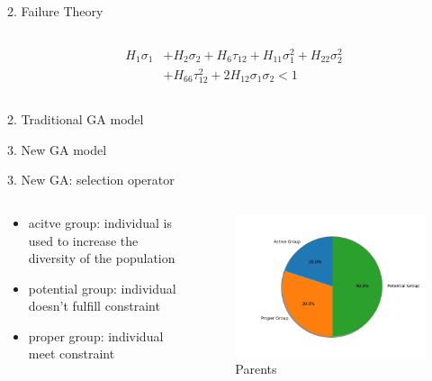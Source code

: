 \documentclass{beamer}
\begin{document}
\begin{frame}{2. Failure Theory }
\begin{columns}[c]
\begin{column}{0.6\textwidth}
\begin{itemize}
		 \begingroup
		 \small
		 \begin{equation*} 
		 \begin{split}
			H_1 \sigma_1  & + H_2 \sigma_2 + H_6 \tau_{12} + H_{11}\sigma_1^2 + H_{22} \sigma_2^2 \\
						  & + H_{66}  \tau_{12}^2 + 2H_{12}\sigma_1\sigma_2 < 1
		 \end{split}
		\end{equation*}
		\endgroup
		\end{itemize}
    \end{column}
\end{columns}
\end{frame}

\begin{frame}{2. Traditional GA model}
	
\end{frame}

\begin{frame}{3. New GA model}
	
\end{frame}

\begin{frame}{3. New GA: selection operator}
    \begin{columns}[c]
    \begin{column}{0.5\textwidth}
		\begin{itemize}
			\item acitve group: individual is used to increase the diversity of the population
			\item potential group: individual doesn't fulfill constraint
			\item proper group: individual meet constraint
		\end{itemize}
    \end{column}
	\begin{column}{0.5\textwidth}
		\begin{figure}
			\caption{Parents}
			\includegraphics[scale=0.5]{fig/chapter2_figure_group_pie.png}
		\end{figure}
	\end{column}
\end{columns}
\end{frame}
\end{document}
